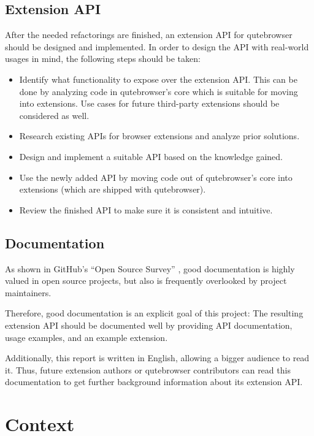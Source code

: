 \subsection{Extension API}
After the needed refactorings are finished, an extension API for qutebrowser
should be designed and implemented. In order to design the API with real-world
usages in mind, the following steps should be taken:

\begin{itemize}
  \item Identify what functionality to expose over the extension API. This can
    be done by analyzing code in qutebrowser's core which is suitable for moving
    into extensions. Use cases for future third-party extensions should be
    considered as well.
  \item Research existing APIs for browser extensions and analyze prior
    solutions.
  \item Design and implement a suitable API based on the knowledge gained.
  \item Use the newly added API by moving code out of qutebrowser's core into
    extensions (which are shipped with qutebrowser).
  \item Review the finished API to make sure it is consistent and intuitive.
\end{itemize}

\subsection{Documentation}

As shown in GitHub's ``Open Source Survey'' \autocite{oss-survey}, good
documentation is highly valued in open source projects, but also is frequently
overlooked by project maintainers.

Therefore, good documentation is an explicit goal of this project: The resulting
extension API should be documented well by providing API documentation,
usage examples, and an example extension.

Additionally, this report is written in English, allowing a bigger audience to
read it. Thus, future extension authors or qutebrowser contributors can read
this documentation to get further background information about its extension
API.

\section{Context}
\label{context}

